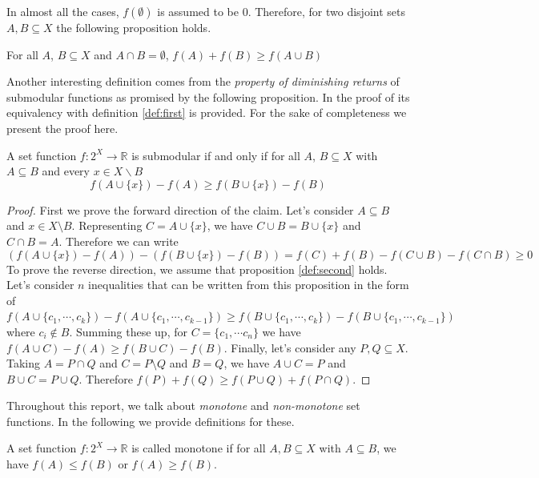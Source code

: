 \noindent In almost all the cases, $f(\emptyset)$ is assumed to be $0$. Therefore, for two disjoint sets $A,B\subseteq X$ the following proposition holds.

\begin{proposition}
 For all $A$, $B\subseteq X$ and $A\cap B = \emptyset$, $f(A)+f(B)\geq f(A\cup B)$
\end{proposition}

\noindent Another interesting definition comes from the \emph{property of diminishing returns} of submodular functions as promised by the following proposition. In \citealp{DBLP:journals/corr/abs-1111-6453} the proof of its equivalency with definition \ref{def:first} is provided. For the sake of completeness we present the proof here.

\begin{proposition}
\label{def:second}
 A set function $f:2^X\rightarrow \mathbb{R}$ is submodular if and only if for all $A$, $B\subseteq X$ with $A \subseteq B$ and every $x \in X \backslash B$ \[f(A\cup \{x\})-f(A)\geq f(B\cup \{x\})-f(B)\]
\end{proposition}

\begin{proof}
 First we prove the forward direction of the claim. Let's consider $A\subseteq B$ and $x\in X\setminus B$. Representing $C=A\cup\{x\}$, we have $C\cup B=B\cup \{x\}$ and $C\cap B=A$. Therefore we can write
 \[\left(f(A\cup \{x\})-f(A)\right)-\left(f(B\cup \{x\})-f(B)\right) = f(C)+f(B)-f(C\cup B)-f(C\cap B)\ge 0\]
 To prove the reverse direction, we assume that proposition \ref{def:second} holds. Let's consider $n$ inequalities that can be written from this proposition in the form of $f(A\cup\{c_1,\cdots,c_k\})-f(A\cup\{c_1,\cdots,c_{k-1}\})\ge f(B\cup\{c_1,\cdots,c_k\})-f(B\cup\{c_1,\cdots,c_{k-1}\})$ where $c_i\notin B$. Summing these up, for $C=\{c_1,\cdots c_n\}$ we have $f(A\cup C)-f(A)\ge f(B\cup C)-f(B)$. Finally, let's consider any $P,Q\subseteq X$. Taking $A=P\cap Q$ and $C=P\setminus Q$ and $B=Q$, we have $A\cup C=P$ and $B\cup C=P\cup Q$. Therefore $f(P)+f(Q)\ge f(P\cup Q)+f(P\cap Q)$.
\end{proof}

\noindent Throughout this report, we talk about \emph{monotone} and \emph{non-monotone} set functions. In the following we provide definitions for these.

\begin{definition}
 A set function $f:2^X\rightarrow \mathbb{R}$ is called monotone if for all $A,B\subseteq X$ with $A\subseteq B$, we have $f(A)\le f(B)$ or $f(A)\ge f(B)$.
\end{definition}

